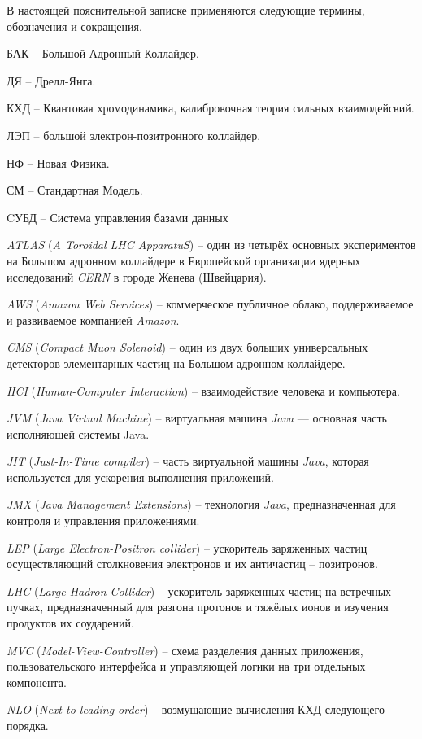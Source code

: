 В настоящей пояснительной записке применяются следующие термины, обозначения и сокращения.

БАК -- Большой Адронный Коллайдер.

ДЯ -- Дрелл-Янга.

КХД -- Квантовая хромодинамика, калибровочная теория сильных взаимодейсвий.

ЛЭП -- большой электрон-позитронного коллайдер.

НФ -- Новая Физика.

СМ -- Стандартная Модель.

CУБД -- Система управления базами данных

\textit{ATLAS} (\textit{A Toroidal LHC ApparatuS}) -- один из четырёх основных экспериментов на Большом адронном коллайдере в Европейской организации ядерных исследований \textit{CERN} в городе Женева (Швейцария).

\textit{AWS} (\textit{Amazon Web Services}) -- коммерческое публичное облако, поддерживаемое и развиваемое компанией \textit{Amazon}.

\textit{CMS} (\textit{Compact Muon Solenoid}) -- один из двух больших универсальных детекторов элементарных частиц на Большом адронном коллайдере.

\textit{HCI} (\textit{Human-Computer Interaction}) -- взаимодействие человека и компьютера.

\textit{JVM} (\textit{Java Virtual Machine}) -- виртуальная машина \textit{Java} — основная часть исполняющей системы Java.

\textit{JIT} (\textit{Just-In-Time compiler}) -- часть виртуальной машины \textit{Java}, которая используется для ускорения выполнения приложений.

\textit{JMX} (\textit{Java Management Extensions}) -- технология \textit{Java}, предназначенная для контроля и управления приложениями.

\textit{LEP} (\textit{Large Electron-Positron collider}) -- ускоритель заряженных частиц осуществляющий столкновения электронов и их античастиц -- позитронов.

\textit{LHC} (\textit{Large Hadron Collider}) --  ускоритель заряженных частиц на встречных пучках, предназначенный для разгона протонов и тяжёлых ионов и изучения продуктов их соударений.

\textit{MVC} (\textit{Model-View-Controller}) -- схема разделения данных приложения, пользовательского интерфейса и управляющей логики на три отдельных компонента.

\textit{NLO} (\textit{Next-to-leading order}) -- возмущающие вычисления КХД следующего порядка.

